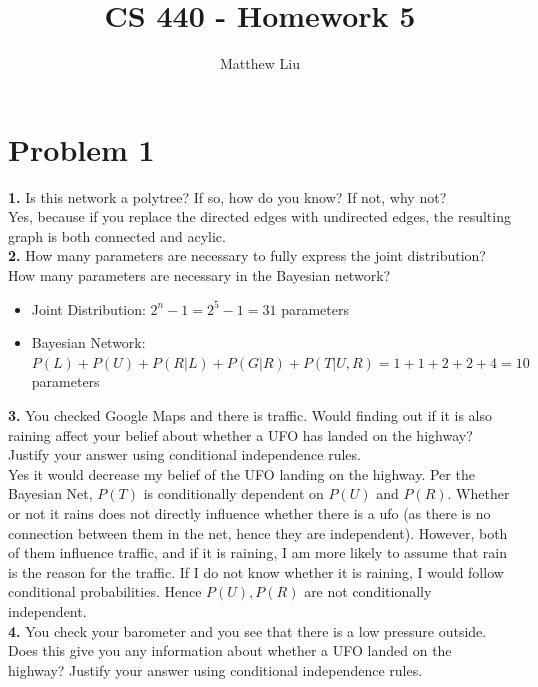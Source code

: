 \documentclass[titlepage]{article}
\title{CS 440 - Homework 5}
\author{Matthew Liu}
\date{}
\begin{document}
\maketitle{}

\section*{Problem 1}

\noindent \textbf{1. } Is this network a polytree? If so, how do you know? If not, why not?\\

Yes, because if you replace the directed edges with undirected edges, the resulting graph is both connected and acylic.\\

\noindent \textbf{2. } How many parameters are necessary to fully express the joint distribution? How many parameters are necessary in the Bayesian network?\\

\begin{itemize}
	\item Joint Distribution: $2^n-1=2^5-1=31$ parameters
	\item Bayesian Network: $P(L)+P(U)+P(R|L)+P(G|R)+P(T|U,R)=1+1+2+2+4=10$ parameters
\end{itemize}

\noindent \textbf{3. } You checked Google Maps and there is traffic. Would finding out if it is also raining affect your belief about whether a UFO has landed on the highway? Justify your answer using conditional independence rules.\\

Yes it would decrease my belief of the UFO landing on the highway. Per the Bayesian Net, $P(T)$ is conditionally dependent on $P(U)$ and $P(R)$. Whether or not it rains does not directly influence whether there is a ufo (as there is no connection between them in the net, hence they are independent). However, both of them influence traffic, and if it is raining, I am more likely to assume that rain is the reason for the traffic. If I do not know whether it is raining, I would follow conditional probabilities. Hence $P(U), P(R)$ are not conditionally independent.\\

\noindent \textbf{4. } You check your barometer and you see that there is a low pressure outside. Does this give you any information about whether a UFO landed on the highway? Justify your answer using conditional independence rules.\\
\end{document}
